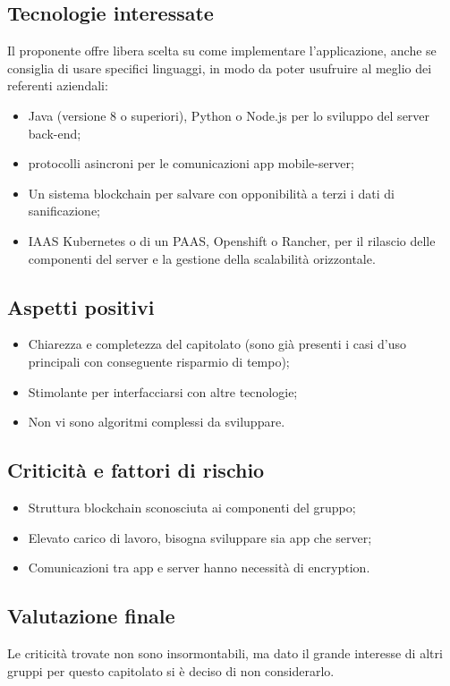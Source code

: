 \subsection{Tecnologie interessate}
Il proponente offre libera scelta su come implementare l'applicazione, anche se consiglia di usare specifici linguaggi, in modo da poter usufruire al meglio dei referenti aziendali:
\begin{itemize}
\item Java (versione 8 o superiori), Python o Node.js per lo sviluppo del server back-end;
\item protocolli asincroni per le comunicazioni app mobile-server;
\item Un sistema blockchain per salvare con opponibilità a terzi i dati di sanificazione;
\item IAAS Kubernetes o di un PAAS, Openshift o Rancher, per il rilascio delle componenti del server e la
gestione della scalabilità orizzontale.
\end{itemize}

\subsection{Aspetti positivi}
\begin{itemize}
\item Chiarezza e completezza del capitolato (sono già presenti i casi d'uso principali con conseguente risparmio di tempo);
\item Stimolante per interfacciarsi con altre tecnologie; 
\item Non vi sono algoritmi complessi da sviluppare.
\end{itemize}

\subsection{Criticità e fattori di rischio}
\begin{itemize}
\item Struttura blockchain sconosciuta ai componenti del gruppo;
\item Elevato carico di lavoro, bisogna sviluppare sia app che server;
\item Comunicazioni tra app e server hanno necessità di encryption.
\end{itemize}

\subsection{Valutazione finale}
Le criticità trovate non sono insormontabili, ma dato il grande interesse di altri gruppi per questo capitolato si è deciso di non considerarlo.

